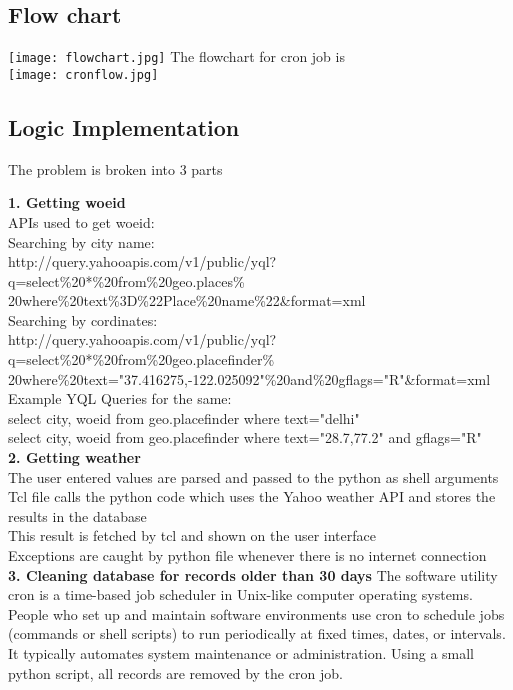 \documentclass[paper=a4, fontsize=11pt]{scrartcl} %
\numberwithin{equation}{section} %
\numberwithin{figure}{section} %
\numberwithin{table}{section} %
\begin{document}
\newpage
\subsection{Flow chart}
 {\center\texttt{[image: flowchart.jpg]}}
The flowchart for cron job is\\
 {\center\texttt{[image: cronflow.jpg]}}


\subsection{Logic Implementation}
The problem is broken into 3 parts

\textbf{1. Getting woeid}\\
APIs used to get woeid:\\

Searching by city name:\\
http://query.yahooapis.com/v1/public/yql?q=select\%20*\%20from\%20geo.places\%\\
20where\%20text\%3D\%22Place\%20name\%22\&format=xml\\

Searching by cordinates:\\
http://query.yahooapis.com/v1/public/yql?q=select\%20*\%20from\%20geo.placefinder\%\\
20where\%20text="37.416275,-122.025092"\%20and\%20gflags="R"\&format=xml\\

Example YQL Queries for the same:\\
select city, woeid from geo.placefinder where text="delhi"\\
select city, woeid from geo.placefinder where text="28.7,77.2" and gflags="R"\\

\textbf{2. Getting weather}\\
The user entered values are parsed and passed to the python as shell arguments\\
Tcl file calls the python code which uses the Yahoo weather API and stores the results in the database\\
This result is fetched by tcl and shown on the user interface\\
Exceptions are caught by python file whenever there is no internet connection\\

\textbf{3. Cleaning database for records older than 30 days}
The software utility cron is a time-based job scheduler in Unix-like computer operating systems. People who set up and maintain software environments use cron to schedule jobs (commands or shell scripts) to run periodically at fixed times, dates, or intervals. It typically automates system maintenance or administration. Using a small python script, all records are removed by the cron job.
\end{document}
